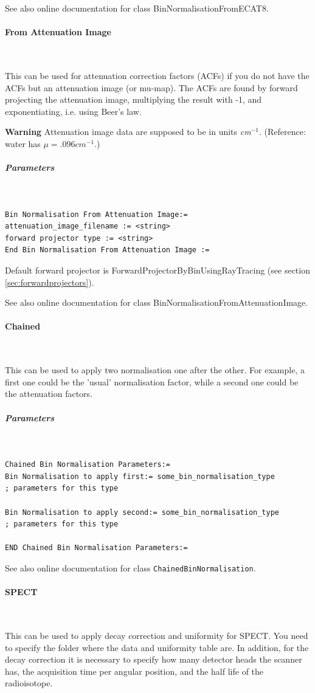 \documentclass{article}
\newcommand{\subsubsubsection}[1]{\paragraph{#1}\mbox{} \\}
\newcommand{\subsubsubsubsection}[1]{\subparagraph{#1} \mbox{} \\}
\begin{document}
{{{{{{See also online documentation for class BinNormalisationFromECAT8.
{ \subsubsubsection{From Attenuation Image}
}
\label{sec:binnormalisationfromattenuationimage}
This can be used for attenuation correction factors (ACFs) if 
you do not have the ACFs but an attenuation image (or mu-map). 
The ACFs are found by forward projecting the attenuation image, 
multiplying the result with -1, and exponentiating, i.e. using 
Beer's law.



\textbf{Warning} Attenuation image data are supposed to be in units \textit{cm}$^{-1}$. 
(Reference: water has $\mu=.096 \mathit{cm}^{-1}$.)

{ \subsubsubsubsection{Parameters}
}
\begin{verbatim}
Bin Normalisation From Attenuation Image:=
attenuation_image_filename := <string>
forward projector type := <string>
End Bin Normalisation From Attenuation Image :=
\end{verbatim}


Default forward projector is ForwardProjectorByBinUsingRayTracing 
(see section \ref{sec:forwardprojectors}).


See also online documentation for class BinNormalisationFromAttenuationImage.

{ \subsubsubsection{Chained }
}
\label{sec:chainedbinnormalisation}
This can be used to apply two normalisation one after the other. 
For example, a first one could be the 'usual' normalisation factor, 
while a second one could be the attenuation factors.

{ \subsubsubsubsection{Parameters}
}
\begin{verbatim}
Chained Bin Normalisation Parameters:=
Bin Normalisation to apply first:= some_bin_normalisation_type
; parameters for this type

Bin Normalisation to apply second:= some_bin_normalisation_type
; parameters for this type

END Chained Bin Normalisation Parameters:=
\end{verbatim}

See also online documentation for class \texttt{ChainedBinNormalisation}.

{ \subsubsubsection{SPECT }
}
\label{sec:SPECTbinnormalisation}
This can be used to apply decay correction and uniformity for SPECT. You need to specify the folder where the data and uniformity table are. In addition, for the decay correction it is necessary to specify how many detector heads the scanner has, the acquisition time per angular position, and  the half life of the radioisotope.

}}}}}}
\end{document}
